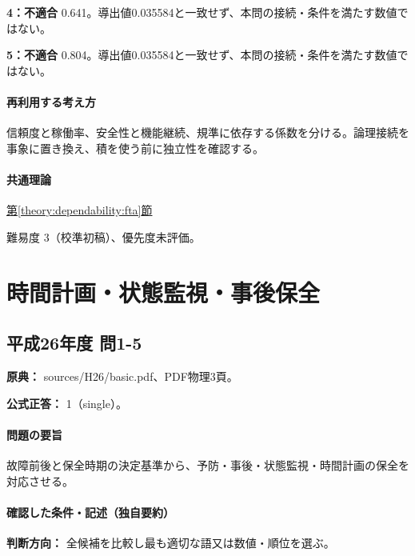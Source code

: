 \noindent\textbf{4：不適合} 0.641。導出値0.035584と一致せず、本問の接続・条件を満たす数値ではない。\par

\noindent\textbf{5：不適合} 0.804。導出値0.035584と一致せず、本問の接続・条件を満たす数値ではない。\par

\paragraph{再利用する考え方} 信頼度と稼働率、安全性と機能継続、規準に依存する係数を分ける。論理接続を事象に置き換え、積を使う前に独立性を確認する。

\paragraph{共通理論} \hyperref[theory:dependability:fta]{第\ref*{theory:dependability:fta}節}

\par 難易度 3（校準初稿）、優先度未評価。

\section{時間計画・状態監視・事後保全}

\subsection{平成26年度 問1-5}
\label{q:h26-reg-basic-1-5}

\noindent\textbf{原典：} sources/H26/basic.pdf、PDF物理3頁。

\textbf{公式正答：} 1（single）。

\paragraph{問題の要旨} 故障前後と保全時期の決定基準から、予防・事後・状態監視・時間計画の保全を対応させる。

\paragraph{確認した条件・記述（独自要約）}\mbox{}\par

\noindent\textbf{判断方向：} 全候補を比較し最も適切な語又は数値・順位を選ぶ。\par

